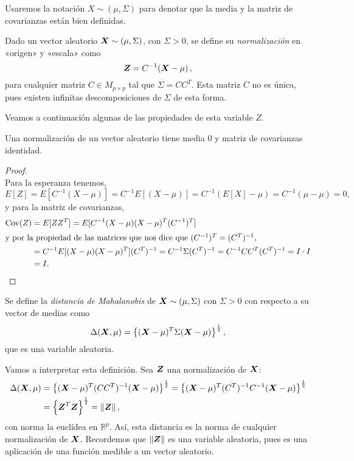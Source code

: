 \begin{nota}
  Usaremos la notación $X\sim(\mu,\Sigma)$ para denotar que la media y la matriz de covarianzas están bien definidas.
\end{nota}

\begin{ndef}[Normalización]
    Dado un vector aleatorio $\boldsymbol{X}\sim(\mu,\Sigma)$, con $\Sigma>0$, se define su \emph{normalización} en «origen» y «escala» como
    \[
  \boldsymbol{Z} = C^{-1}(\boldsymbol{X} - \mu)\,,
\]
para cualquier matriz $C\in M_{p\times p}$ tal que $\Sigma = CC^T$. Esta matriz $C$ no es única, pues existen infinitas descomposiciones de $\Sigma$ de esta forma.

  \end{ndef}

Veamos a continuación algunas de las propiedades de esta variable $Z$.
\begin{nprop}
  Una normalización de un vector aleatorio tiene media $0$ y matriz de covarianzas identidad.
\end{nprop}

\begin{proof} \hfill\\
  Para la esperanza tenemos, \[
  E[Z] = E[C^{-1}(X-\mu)] = C^{-1}E[(X-\mu)] = C^{-1}(E[X] - \mu) = C^{-1}(\mu - \mu ) = 0,
  \] y para la matriz de covarianzas, \begin{align*}
    \operatorname{Cov}(Z) &= E[ZZ ^T] = E[C^{-1}(X-\mu)(X-\mu)^T(C^{-1})^T]\\
    \intertext{y por la propiedad de las matrices que nos dice que $(C^{-1})^T = (C^T)^{-1}$,}
      &= C^{-1}E[(X-\mu)(X-\mu)^T](C^T)^{-1} = C^{-1} \Sigma (C^T)^{-1} = C^{-1}CC^T(C^T)^{-1} = I \cdot I\\ 
      &= I.\qedhere
  \end{align*}
\end{proof}

\begin{ndef}
    Se define la \emph{distancia de Mahalanobis} de $\boldsymbol{X}\sim(\mu,\Sigma)$ con $\Sigma > 0$ con respecto a su vector de medias como
    \[
    \Delta(\boldsymbol{X},\mu) = \left\{ (\boldsymbol{X}-\mu)^T \Sigma (\boldsymbol{X}-\mu) \right\} ^{\frac{1}{2}},
    \]
    que es una variable aleatoria.
  \end{ndef}

  Vamos a interpretar esta definición. Sea $\boldsymbol{Z}$ una normalización de $\boldsymbol{X}$: \begin{align*}
    \Delta(\boldsymbol{X},\mu) &= \left\{ (\boldsymbol{X}-\mu)^T (CC^T)^{-1}(\boldsymbol{X}-\mu)\right\}^{\frac{1}{2}} = \left\{ (\boldsymbol{X}-\mu)^T (C^T)^{-1}C^{-1}(\boldsymbol{X}-\mu)\right\}^{\frac{1}{2}}\\
      &= \left\{\boldsymbol{Z}^T \boldsymbol{Z}\right\}^{\frac{1}{2}} = \Vert \boldsymbol{Z}\Vert\,,
  \end{align*} con norma la euclídea en $\mathbb R^p$. Así, esta distancia es la norma de cualquier normalización de $\boldsymbol{X}$. Recordemos que $\Vert \boldsymbol{Z}\Vert$ es una variable aleatoria, pues es una aplicación de una función medible a un vector aleatorio.

